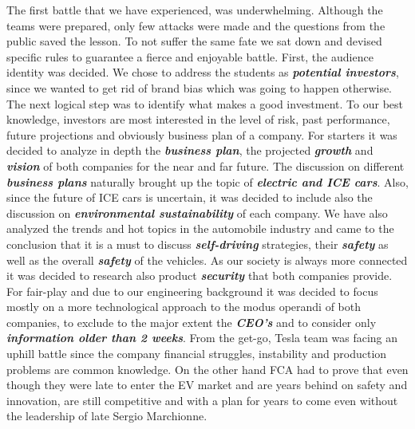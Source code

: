 The first battle that we have experienced, was underwhelming. Although the teams were prepared, only few attacks were made and the questions from the public saved the lesson. To not suffer the same fate we sat down and devised specific rules to guarantee  a fierce and enjoyable battle.
First, the audience identity was decided. We chose to address the students as \textbf{\textit{potential investors}}, since we wanted to get rid of brand bias which was going to happen otherwise. The next logical step was to identify what makes a good investment.
To our best knowledge, investors are most interested in the level of risk, past performance, future projections and obviously business plan of a company.
For starters it was decided to analyze in depth the
\textbf{\textit{business plan}}, the projected \textbf{\textit{growth}} and \textbf{\textit{vision}} of both companies for the near and far future. 
The discussion on different \textbf{\textit{business plans}} naturally brought up the topic of \textbf{\textit{electric and ICE cars}}.
Also, since the future of ICE cars is uncertain, it was decided to include also the discussion on  \textbf{\textit{environmental sustainability}} of each company.
We have also analyzed the trends and hot topics in the automobile industry and came to the conclusion that it is a must to discuss \textbf{\textit{self-driving}} strategies, their \textbf{\textit{safety}} as well as the overall \textbf{\textit{safety}} of the vehicles.
As our society is always more connected it was decided to research also product \textbf{\textit{security}} that both companies provide.
\newline For fair-play and due to our engineering background it was decided to focus mostly on a more technological approach to the modus operandi of both companies, to exclude to the major extent the \textbf{\textit{CEO's}} and to consider only \textbf{\textit{information older than 2 weeks}}.
\newline From the get-go, Tesla team was facing an uphill battle since the company financial struggles, instability and production problems are common knowledge.
\newline On the other hand FCA had to prove that even though they were late to enter the EV market and are years behind on safety and innovation, are still competitive and with a plan for years to come even without the leadership of late Sergio Marchionne.

